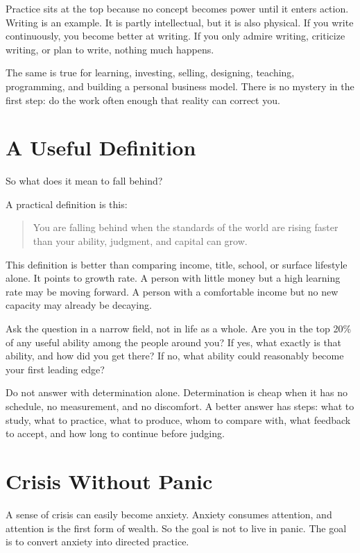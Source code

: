 Practice sits at the top because no concept becomes power until it enters action. Writing is an example. It is partly intellectual, but it is also physical. If you write continuously, you become better at writing. If you only admire writing, criticize writing, or plan to write, nothing much happens.

The same is true for learning, investing, selling, designing, teaching, programming, and building a personal business model. There is no mystery in the first step: do the work often enough that reality can correct you.

\section*{A Useful Definition}

So what does it mean to fall behind?

A practical definition is this:

\begin{quote}
You are falling behind when the standards of the world are rising faster than your ability, judgment, and capital can grow.
\end{quote}

This definition is better than comparing income, title, school, or surface lifestyle alone. It points to growth rate. A person with little money but a high learning rate may be moving forward. A person with a comfortable income but no new capacity may already be decaying.

Ask the question in a narrow field, not in life as a whole. Are you in the top 20\% of any useful ability among the people around you? If yes, what exactly is that ability, and how did you get there? If no, what ability could reasonably become your first leading edge?

Do not answer with determination alone. Determination is cheap when it has no schedule, no measurement, and no discomfort. A better answer has steps: what to study, what to practice, what to produce, whom to compare with, what feedback to accept, and how long to continue before judging.

\section*{Crisis Without Panic}

A sense of crisis can easily become anxiety. Anxiety consumes attention, and attention is the first form of wealth. So the goal is not to live in panic. The goal is to convert anxiety into directed practice.

